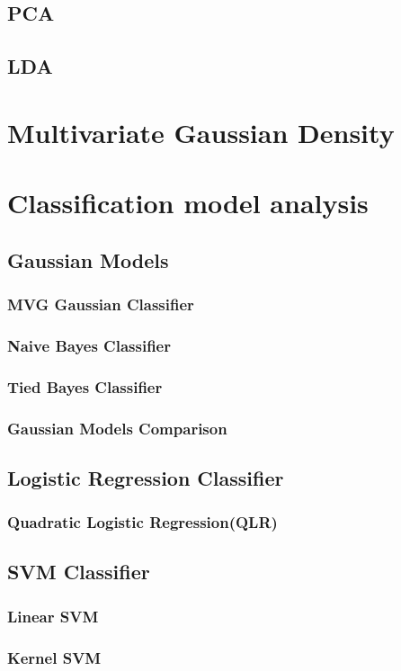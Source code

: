 \documentclass{article}
\begin{document}
\subsection{PCA}
\subsection{LDA}
\section{Multivariate Gaussian Density}

\section{Classification model analysis}
\subsection{Gaussian Models}
\subsubsection{MVG Gaussian Classifier}
\subsubsection{Naive Bayes Classifier}
\subsubsection{Tied Bayes Classifier}
\subsubsection{Gaussian Models Comparison}
\subsection{Logistic Regression Classifier}
\subsubsection{Quadratic Logistic Regression(QLR)}
\subsection{SVM Classifier}
\subsubsection{Linear SVM}
\subsubsection{Kernel SVM}
\end{document}
